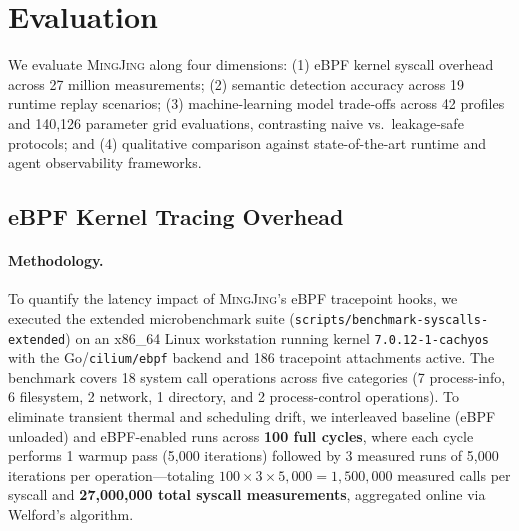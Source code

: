\documentclass[10pt,twocolumn,letterpaper]{article}
\newcommand{\sys}{\textsc{MingJing}}
\newcommand{\code}[1]{\texttt{\small #1}}
\begin{document}
\section{Evaluation}
\label{sec:eval}

We evaluate \sys{} along four dimensions: (1) eBPF kernel syscall overhead across 27 million measurements; (2) semantic detection accuracy across 19 runtime replay scenarios; (3) machine-learning model trade-offs across 42 profiles and 140,126 parameter grid evaluations, contrasting naive vs.\ leakage-safe protocols; and (4) qualitative comparison against state-of-the-art runtime and agent observability frameworks.

\subsection{eBPF Kernel Tracing Overhead}
\paragraph{Methodology.} To quantify the latency impact of \sys{}'s eBPF tracepoint hooks, we executed the extended microbenchmark suite (\code{scripts/benchmark-syscalls-extended}) on an x86\_64 Linux workstation running kernel \code{7.0.12-1-cachyos} with the Go/\code{cilium/ebpf} backend and 186 tracepoint attachments active. The benchmark covers 18 system call operations across five categories (7 process-info, 6 filesystem, 2 network, 1 directory, and 2 process-control operations). To eliminate transient thermal and scheduling drift, we interleaved baseline (eBPF unloaded) and eBPF-enabled runs across \textbf{100 full cycles}, where each cycle performs 1 warmup pass (5,000 iterations) followed by 3 measured runs of 5,000 iterations per operation---totaling $100 \times 3 \times 5{,}000 = 1{,}500{,}000$ measured calls per syscall and \textbf{27,000,000 total syscall measurements}, aggregated online via Welford's algorithm.
\end{document}
